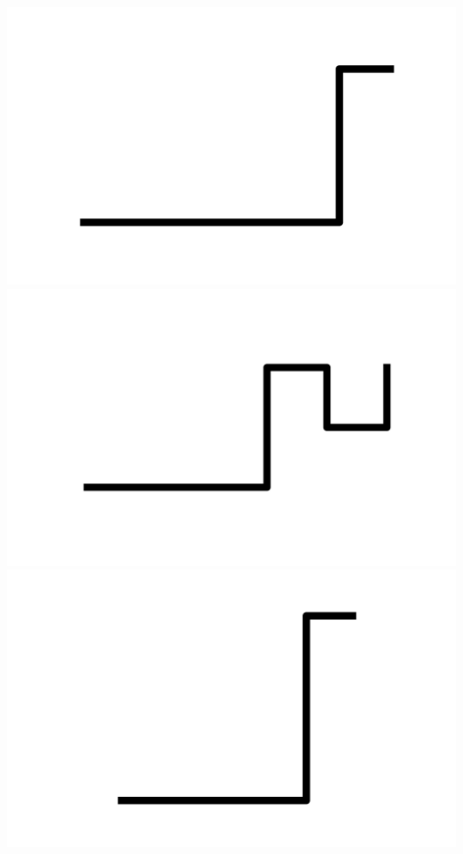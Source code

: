 \documentclass[]{report}
\begin{document}
\includegraphics[scale=.1]{pictures/21/state_cluster_shapes_427.pdf} 
\includegraphics[scale=.1]{pictures/21/state_cluster_shapes_428.pdf} 
\includegraphics[scale=.1]{pictures/21/state_cluster_shapes_429.pdf} 
\end{document}
